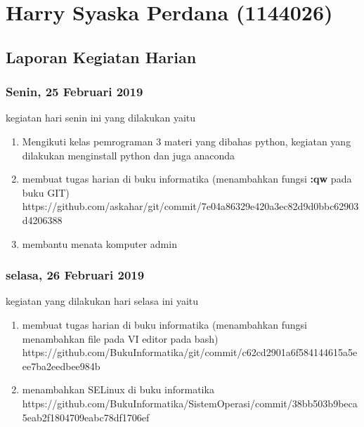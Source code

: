 \chapter{Harry Syaska Perdana (1144026)}
\section{Laporan Kegiatan Harian}
\subsection{Senin, 25 Februari 2019}
kegiatan hari senin ini yang dilakukan yaitu
\begin{enumerate}
\item Mengikuti kelas pemrograman 3 materi yang dibahas python, kegiatan yang dilakukan menginstall python dan juga anaconda
\item membuat tugas harian di buku informatika (menambahkan fungsi \textbf{:qw} pada buku GIT)   
\subitem https://github.com/askahar/git/commit/7e04a86329e420a3ec82d9d0bbc62903d4206388
\item membantu menata komputer admin
\end{enumerate}
\subsection{selasa, 26 Februari 2019}
kegiatan yang dilakukan hari selasa ini yaitu
\begin{enumerate}
\item  membuat tugas harian di buku informatika (menambahkan fungsi menambahkan file pada VI editor pada bash)
\subitem https://github.com/BukuInformatika/git/commit/c62cd2901a6f584144615a5eee7ba2eedbee984b 
\item menambahkan SELinux di buku informatika 
\subitem https://github.com/BukuInformatika/SistemOperasi/commit/38bb503b9beca5eab2f1804709eabc78df1706ef
\end{enumerate}
